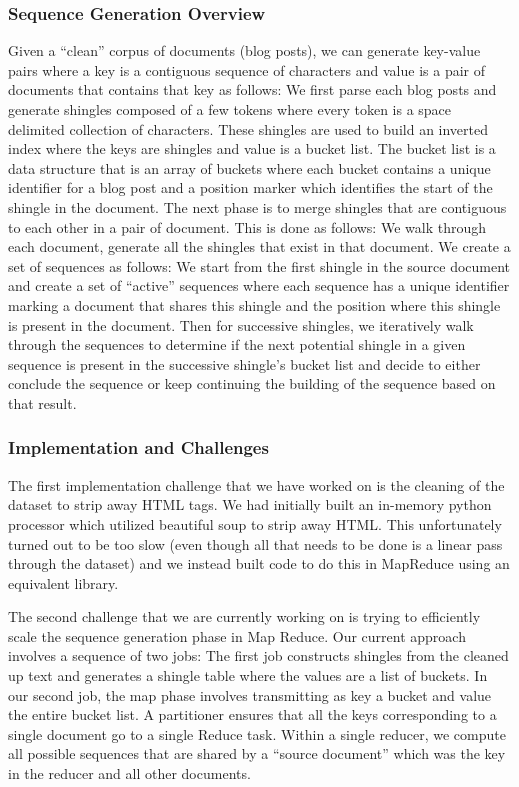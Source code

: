 \documentclass{acm_proc_article-sp}
\begin{document}
\subsubsection{Sequence Generation Overview}
Given a ``clean'' corpus of documents (blog posts), we can generate key-value pairs where a key is a contiguous sequence of characters and value is a pair of documents that contains that key as follows: We first parse each blog posts and generate shingles composed of a few tokens where every token is a space delimited collection of characters. These shingles are used to build an inverted index where the keys are shingles and value is a bucket list. The bucket list is a data structure that is an array of buckets where each bucket contains a unique identifier for a blog post and a position marker which identifies the start of the shingle in the document. The next phase is to merge shingles that are contiguous to each other in a pair of document. This is done as follows: We walk through each document, generate all the shingles that exist in that document. We create a set of sequences as follows: We start from the first shingle in the source document and create a set of ``active'' sequences where each sequence has a unique identifier marking a document that shares this shingle and the position where this shingle is present in the document. Then for successive shingles, we iteratively walk through the sequences to determine if the next potential shingle in a given sequence is present in the successive shingle's bucket list and decide to either conclude the sequence or keep continuing the building of the sequence based on that result. 

\subsubsection{Implementation and Challenges}
The first implementation challenge that we have worked on is the cleaning of the dataset to strip away HTML tags. We had initially built an in-memory python processor which utilized beautiful soup to strip away HTML. This unfortunately turned out to be too slow (even though all that needs to be done is a linear pass through the dataset) and we instead built code to do this in MapReduce using an equivalent library. 

 The second challenge that we are currently working on is trying to efficiently scale the sequence generation phase in Map Reduce. Our current approach involves a sequence of two jobs: The first job constructs shingles from the cleaned up text and generates a shingle table where the values are a list of buckets. In our second job, the map phase involves transmitting as key a bucket and value the entire bucket list. A partitioner ensures that all the keys corresponding to a single document go to a single Reduce task. Within a single reducer, we compute all possible sequences that are shared by a ``source document'' which was the key in the reducer and all other documents. 
 
\end{document}
